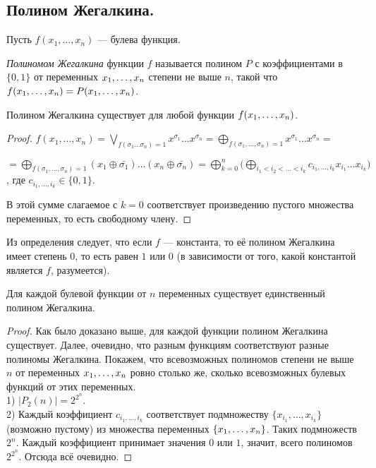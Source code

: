 \subsection{Полином Жегалкина.} 
Пусть $f(x_1, \ldots, x_n)$ --- булева функция. %
\begin{definition} \textit{Полиномом Жегалкина} функции $f$ называется полином $P$ с коэффициентами в $\{0,1\}$ от переменных $x_1, \ldots, x_n$ степени не выше $n$, такой что $f(x_1, \ldots, x_n) = P(x_1, \ldots, x_n)$. \end{definition}
\begin{statement}
    Полином Жегалкина существует для любой функции $f(x_1, \ldots, x_n)$.
\end{statement}
\begin{proof}
$f(x_1, \ldots, x_n)=\bigvee \limits_{f(\sigma_1 \ldots \sigma_n)=1} x^{\sigma_1} \ldots x^{\sigma_n}=\bigoplus \limits_{f(\sigma_1, \ldots, \sigma_n)=1} x^{\sigma_1} \ldots x^{\sigma_n}=$ 
\begin{flushright}
$
=\bigoplus \limits_{f(\sigma_1, \ldots, \sigma_n)=1} (x_1\oplus \bar{\sigma_1})\ldots(x_n\oplus \bar{\sigma_n})=\bigoplus \limits^n_{k=0} \big( \bigoplus \limits_{i_1<i_2< \ldots<i_k} c_{i_1, \ldots, i_k}x_{i_1} \ldots x_{i_k}\big) $, где  $c_{i_1, \ldots, i_k} \in \{0,1\}$.
\end{flushright} 
В этой сумме слагаемое с $k=0$ соответствует произведению пустого множества переменных, то есть свободному члену.
\end{proof}

Из определения следует, что если $f$ --- константа, то её полином Жегалкина имеет степень $0$, то есть равен $1$ или $0$ (в зависимости от того, какой константой является $f$, разумеется). 
\begin{statement}
	Для каждой булевой функции от $n$ переменных существует единственный полином Жегалкина.
\end{statement}
\begin{proof}
    Как было доказано выше, для каждой функции полином Жегалкина существует. Далее, очевидно, что разным функциям соответствуют разные полиномы Жегалкина. Покажем, что всевозможных полиномов степени не выше $n$ от переменных $x_1, \ldots, x_n$ ровно столько же, сколько всевозможных булевых функций от этих переменных. \\
    1) $|P_2(n)|=2^{2^{n}}$.\\
    2) Каждый коэффициент $c_{i_1, \ldots, i_k}$ соответствует подмножеству $\{x_{i_1}, \ldots, x_{i_k}\}$ (возможно пустому) из множества переменных $\{x_1, \ldots, x_n\}$. Таких подмножеств $2^{n}$. Каждый коэффициент принимает значения $0$ или $1$, значит, всего полиномов $2^{2^n}$. Отсюда всё очевидно.
\end{proof}
